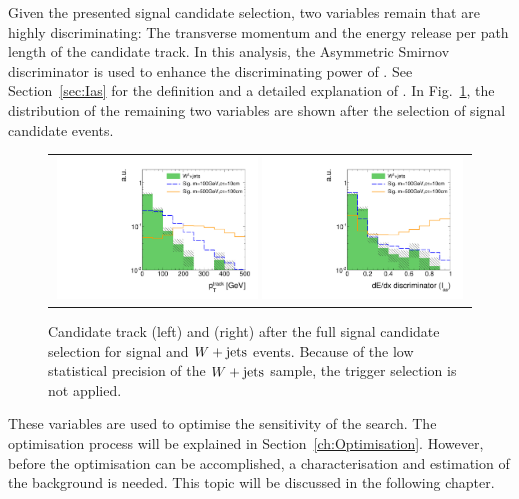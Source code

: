 Given the presented signal candidate selection, two variables remain that are highly discriminating:
The transverse momentum \pt and the energy release per path length \dedx of the candidate track.
In this analysis, the Asymmetric Smirnov discriminator \ias is used to enhance the discriminating power of \dedx.
See Section~\ref{sec:Ias} for the definition and a detailed explanation of \ias.
In Fig.~\ref{fig:PtAndIasAfterFullPreselection}, the distribution of the remaining two variables are shown after the selection of signal candidate events.
\begin{figure}[!b]
  \centering 
  \begin{tabular}{c}
    \includegraphics[width=0.49\textwidth]{figures/analysis_2/AnalysisSelection/chiTracksfullSelectionNoTriggerCuts_Wjets/htrackPtSmallRangeCoarseBinning_log.pdf}
    \includegraphics[width=0.49\textwidth]{figures/analysis_2/AnalysisSelection/chiTracksfullSelectionNoTriggerCuts_Wjets/htrackASmiSmallRange_log.pdf}
  \end{tabular}
  \caption{Candidate track \pt (left) and \ias (right) after the full signal candidate selection for signal and $W+\text{jets}$ events. 
           Because of the low statistical precision of the $W+\text{jets}$ sample, the trigger selection is not applied.
           }
  \label{fig:PtAndIasAfterFullPreselection}
\end{figure}
These variables are used to optimise the sensitivity of the search.
The optimisation process will be explained in Section~\ref{ch:Optimisation}.
However, before the optimisation can be accomplished, a characterisation and estimation of the background is needed.
This topic will be discussed in the following chapter.




